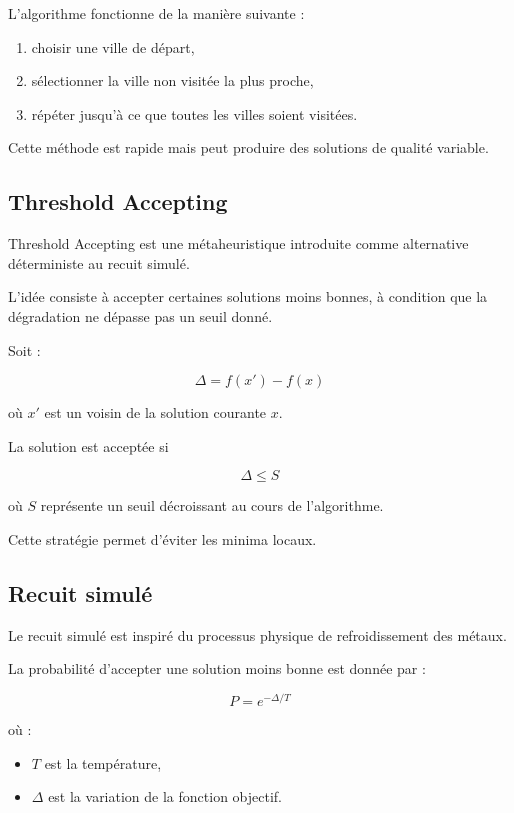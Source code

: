 \documentclass[11pt,a4paper]{article}
\begin{document}
L’algorithme fonctionne de la manière suivante :

\begin{enumerate}
\item choisir une ville de départ,
\item sélectionner la ville non visitée la plus proche,
\item répéter jusqu’à ce que toutes les villes soient visitées.
\end{enumerate}

Cette méthode est rapide mais peut produire des solutions de qualité
variable.

\subsection{Threshold Accepting}

Threshold Accepting est une métaheuristique introduite comme
alternative déterministe au recuit simulé.

L’idée consiste à accepter certaines solutions moins bonnes,
à condition que la dégradation ne dépasse pas un seuil donné.

Soit :

\[
\Delta = f(x') - f(x)
\]

où $x'$ est un voisin de la solution courante $x$.

La solution est acceptée si

\[
\Delta \leq S
\]

où $S$ représente un seuil décroissant au cours de l’algorithme.

Cette stratégie permet d’éviter les minima locaux.

\subsection{Recuit simulé}

Le recuit simulé est inspiré du processus physique de refroidissement
des métaux.

La probabilité d’accepter une solution moins bonne est donnée par :

\[
P = e^{-\Delta/T}
\]

où :

\begin{itemize}
\item $T$ est la température,
\item $\Delta$ est la variation de la fonction objectif.
\end{itemize}
\end{document}
